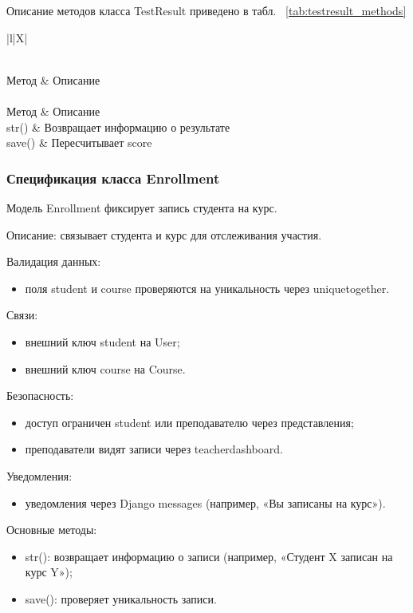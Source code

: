 Описание методов класса TestResult приведено в табл. ~\ref {tab:testresult_methods}

\begin{xltabular}{\textwidth}{|l|X|}
	\caption{Методы класса TestResult\label{tab:testresult_methods}}\\
	\hline
	Метод & Описание \\ \hline
	\endfirsthead
	\\
	\hline
	Метод & Описание \\ \hline
	\endhead
	str() & Возвращает информацию о результате \\ \hline
	save() & Пересчитывает score \\ \hline
\end{xltabular}

\subsubsection{Спецификация класса Enrollment}

Модель Enrollment фиксирует запись студента на курс.


Описание: связывает студента и курс для отслеживания участия.

Валидация данных:
	\begin{itemize}
		\item поля student и course проверяются на уникальность через uniquetogether.
	\end{itemize}
	
Связи:
	\begin{itemize}
		\item внешний ключ student на User;
		\item внешний ключ course на Course.
	\end{itemize}
	
Безопасность:
	\begin{itemize}
		\item доступ ограничен student или преподавателю через представления;
		\item преподаватели видят записи через teacherdashboard.
	\end{itemize}
	
Уведомления:
	\begin{itemize}
		\item уведомления через Django messages (например, «Вы записаны на курс»).
	\end{itemize}
	
Основные методы:
	\begin{itemize}
		\item str(): возвращает информацию о записи (например, «Студент X записан на курс Y»);
		\item save(): проверяет уникальность записи.
	\end{itemize}
	
